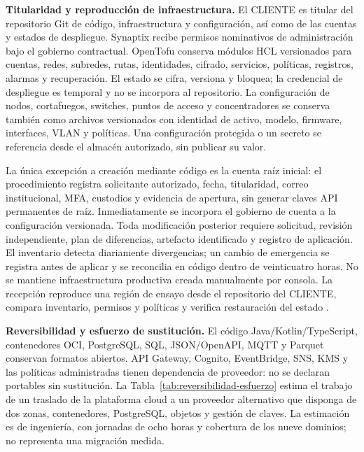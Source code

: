 \textbf{Titularidad y reproducción de infraestructura.}
El CLIENTE es titular del repositorio Git de código, infraestructura y configuración, así como de las cuentas y estados de despliegue. Synaptix recibe permisos nominativos de administración bajo el gobierno contractual. OpenTofu conserva módulos HCL versionados para cuentas, redes, subredes, rutas, identidades, cifrado, servicios, políticas, registros, alarmas y recuperación. El estado se cifra, versiona y bloquea; la credencial de despliegue es temporal y no se incorpora al repositorio. La configuración de nodos, cortafuegos, switches, puntos de acceso y concentradores se conserva también como archivos versionados con identidad de activo, modelo, firmware, interfaces, VLAN y políticas. Una configuración protegida o un secreto se referencia desde el almacén autorizado, sin publicar su valor.

La única excepción a creación mediante código es la cuenta raíz inicial: el procedimiento registra solicitante autorizado, fecha, titularidad, correo institucional, MFA, custodios y evidencia de apertura, sin generar claves API permanentes de raíz. Inmediatamente se incorpora el gobierno de cuenta a la configuración versionada. Toda modificación posterior requiere solicitud, revisión independiente, plan de diferencias, artefacto identificado y registro de aplicación. El inventario detecta diariamente divergencias; un cambio de emergencia se registra antes de aplicar y se reconcilia en código dentro de veinticuatro horas. No se mantiene infraestructura productiva creada manualmente por consola. La recepción reproduce una región de ensayo desde el repositorio del CLIENTE, compara inventario, permisos y políticas y verifica restauración del estado \parencite[RT-03.03, p.~8]{pucv-transversal}.

\textbf{Reversibilidad y esfuerzo de sustitución.}
El código Java/Kotlin/TypeScript, contenedores OCI, PostgreSQL, SQL, JSON/OpenAPI, MQTT y Parquet conservan formatos abiertos. API Gateway, Cognito, EventBridge, SNS, KMS y las políticas administradas tienen dependencia de proveedor: no se declaran portables sin sustitución. La Tabla~\ref{tab:reversibilidad-esfuerzo} estima el trabajo de un traslado de la plataforma cloud a un proveedor alternativo que disponga de dos zonas, contenedores, PostgreSQL, objetos y gestión de claves. La estimación es de ingeniería, con jornadas de ocho horas y cobertura de los nueve dominios; no representa una migración medida.

